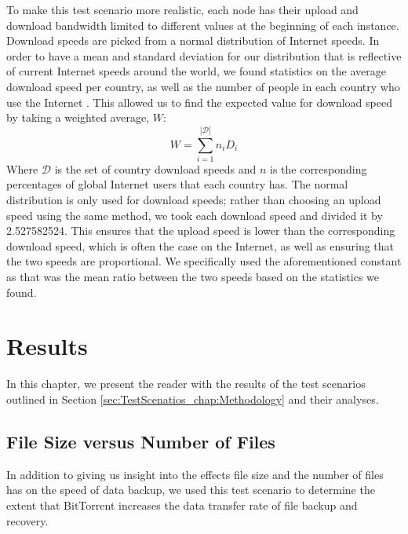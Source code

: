 \documentclass[12pt]{report}
\begin{document}
To make this test scenario more realistic, each node has their upload and download bandwidth limited to different values at the beginning of each instance. Download speeds are picked from a normal distribution of Internet speeds. In order to have a mean and standard deviation for our distribution that is reflective of current Internet speeds around the world, we found statistics on the average download speed per country, as well as the number of people in each country who use the Internet \cite{internetUsersByCountry,downloadSpeedsByCountry}. This allowed us to find the expected value for download speed by taking a weighted average, $W$:
$$
W=\sum\limits_{i=1}^{|\mathcal{D}|} n_iD_i
$$
Where $\mathcal{D}$ is the set of country download speeds and $n$ is the corresponding percentages of global Internet users that each country has. The normal distribution is only used for download speeds; rather than choosing an upload speed using the same method, we took each download speed and divided it by 2.527582524. This ensures that the upload speed is lower than the corresponding download speed, which is often the case on the Internet, as well as ensuring that the two speeds are proportional. We specifically used the aforementioned constant as that was the mean ratio between the two speeds based on the statistics we found.


\chapter{Results} \label{chap:Results}

In this chapter, we present the reader with the results of the test scenarios outlined in Section \ref{sec:TestScenatios_chap:Methodology} and their analyses.

\section{File Size versus Number of Files} \label{sec:FileSizeversusNumberofFiles_chap:Results}

In addition to giving us insight into the effects file size and the number of files has on the speed of data backup, we used this test scenario to determine the extent that BitTorrent increases the data transfer rate of file backup and recovery.
\end{document}
